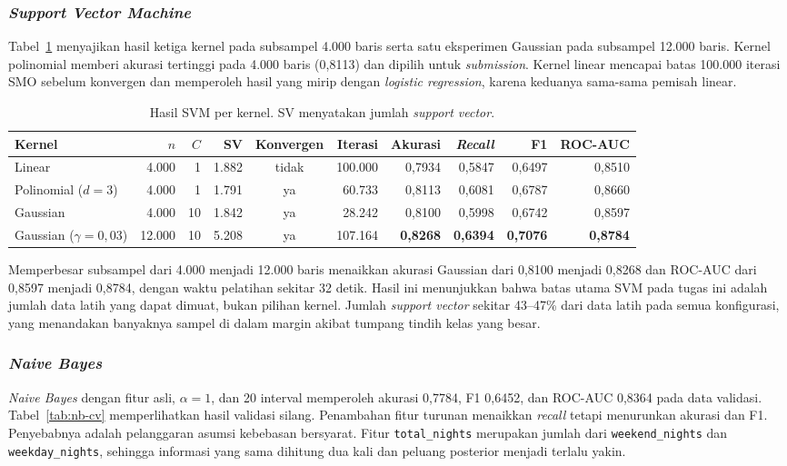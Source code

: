 \subsubsection{\textit{Support Vector Machine}}
Tabel~\ref{tab:svm} menyajikan hasil ketiga kernel pada subsampel 4.000 baris serta satu eksperimen Gaussian pada subsampel 12.000 baris. Kernel polinomial memberi akurasi tertinggi pada 4.000 baris (0,8113) dan dipilih untuk \textit{submission}. Kernel linear mencapai batas 100.000 iterasi SMO sebelum konvergen dan memperoleh hasil yang mirip dengan \textit{logistic regression}, karena keduanya sama-sama pemisah linear.

\begin{table}[htbp]
    \centering
    \footnotesize
    \setlength{\tabcolsep}{4pt}
    \begin{tabular}{@{}l r r r c r r r r r@{}}
        \toprule
        Kernel & $n$ & $C$ & SV & Konvergen & Iterasi & Akurasi & \textit{Recall} & F1 & ROC-AUC \\
        \midrule
        Linear & 4.000 & 1 & 1.882 & tidak & 100.000 & 0,7934 & 0,5847 & 0,6497 & 0,8510 \\
        Polinomial ($d=3$) & 4.000 & 1 & 1.791 & ya & 60.733 & 0,8113 & 0,6081 & 0,6787 & 0,8660 \\
        Gaussian & 4.000 & 10 & 1.842 & ya & 28.242 & 0,8100 & 0,5998 & 0,6742 & 0,8597 \\
        Gaussian ($\gamma=0{,}03$) & 12.000 & 10 & 5.208 & ya & 107.164 & \textbf{0,8268} & \textbf{0,6394} & \textbf{0,7076} & \textbf{0,8784} \\
        \bottomrule
    \end{tabular}
    \caption{Hasil SVM per kernel. SV menyatakan jumlah \textit{support vector}.}
    \label{tab:svm}
\end{table}

Memperbesar subsampel dari 4.000 menjadi 12.000 baris menaikkan akurasi Gaussian dari 0,8100 menjadi 0,8268 dan ROC-AUC dari 0,8597 menjadi 0,8784, dengan waktu pelatihan sekitar 32 detik. Hasil ini menunjukkan bahwa batas utama SVM pada tugas ini adalah jumlah data latih yang dapat dimuat, bukan pilihan kernel. Jumlah \textit{support vector} sekitar 43--47\% dari data latih pada semua konfigurasi, yang menandakan banyaknya sampel di dalam margin akibat tumpang tindih kelas yang besar.

\subsubsection{\textit{Naive Bayes}}\label{sec:hasil-nb}
\textit{Naive Bayes} dengan fitur asli, $\alpha=1$, dan 20 interval memperoleh akurasi 0,7784, F1 0,6452, dan ROC-AUC 0,8364 pada data validasi. Tabel~\ref{tab:nb-cv} memperlihatkan hasil validasi silang. Penambahan fitur turunan menaikkan \textit{recall} tetapi menurunkan akurasi dan F1. Penyebabnya adalah pelanggaran asumsi kebebasan bersyarat. Fitur \texttt{total\_nights} merupakan jumlah dari \texttt{weekend\_nights} dan \texttt{weekday\_nights}, sehingga informasi yang sama dihitung dua kali dan peluang posterior menjadi terlalu yakin.

